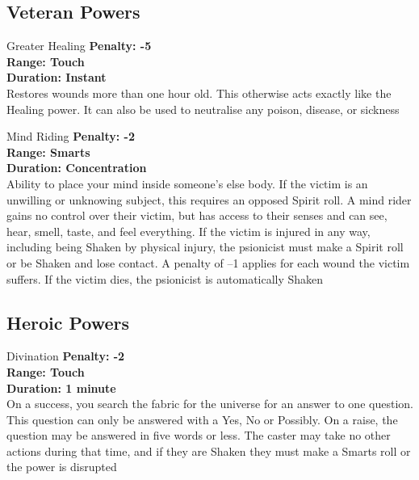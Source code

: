 \begin{multicols}{2}
\subsection{Veteran Powers}

\begin{genericsection}{Greater Healing}
\textbf{Penalty: -5}\\
\textbf{Range: Touch}\\
\textbf{Duration: Instant}\\
Restores wounds more than one hour old. This otherwise acts exactly like the Healing power. It can also be used to neutralise any poison, disease, or sickness
\end{genericsection}

\begin{genericsection}{Mind Riding}
\textbf{Penalty: -2}\\
\textbf{Range: Smarts}\\
\textbf{Duration: Concentration}\\
Ability to place your mind inside someone’s else body. If the victim is an unwilling or unknowing subject, this requires an opposed Spirit roll. A mind rider gains no control over their victim, but has access to their senses and can see, hear, smell, taste, and feel everything. If the victim is injured in any way, including being Shaken by physical injury, the psionicist must make a Spirit roll or be Shaken and lose contact. A penalty of –1 applies for each wound the victim suffers. If the victim dies, the psionicist is automatically Shaken
\end{genericsection}

\subsection{Heroic Powers}

\begin{genericsection}{Divination}
\textbf{Penalty: -2}\\
\textbf{Range: Touch}\\
\textbf{Duration: 1 minute}\\
On a success, you search the fabric for the universe for an answer to one question. This question can only be answered with a Yes, No or Possibly. On a raise, the question may be answered in five words or less. The caster may take no other actions during that time, and if they are Shaken they must make a Smarts roll or the power is disrupted
\end{genericsection}

\end{multicols}
